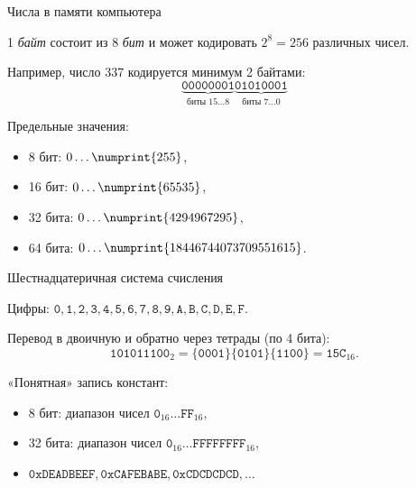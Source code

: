 \documentclass{beamer}
\newcommand{\num}[1]{\numprint{#1}}
\newcommand{\pcnum}[1]{\ensuremath{\mathtt{#1}}}
\newcommand{\bin}[1]{\pcnum{#1}_2}
\newcommand{\hex}[1]{\pcnum{#1}_{16}}
\begin{document}
\begin{frame}{Числа в памяти компьютера}

  1 \emph{байт} состоит из 8 \emph{бит} и может кодировать $2^8 = 256$
  различных чисел.

  Например, число 337 кодируется минимум 2 байтами:
  \[
    \underbrace{\pcnum{00000001}}_{\text{биты } 15 \ldots 8}
    \underbrace{\pcnum{01010001}}_{\text{биты } 7 \ldots 0}
  \]

  Предельные значения:
  \begin{itemize}
    \item 8 бит: $0 \ldots \num{255}$,
    \item 16 бит: $0 \ldots \num{65535}$,
    \item 32 бита: $0 \ldots \num{4294967295}$,
    \item 64 бита: $0 \ldots \num{18446744073709551615}$.
  \end{itemize}
\end{frame}

\begin{frame}{Шестнадцатеричная система счисления}

  Цифры: $\pcnum{0}, \pcnum{1}, \pcnum{2}, \pcnum{3}, \pcnum{4}, \pcnum{5},
  \pcnum{6}, \pcnum{7}, \pcnum{8}, \pcnum{9}, \pcnum{A}, \pcnum{B}, \pcnum{C},
  \pcnum{D}, \pcnum{E}, \pcnum{F}$.

  Перевод в двоичную и обратно через тетрады (по 4 бита):
  \[
    \bin{101011100} = \pcnum{\{0001\}\{0101\}\{1100\}} = \hex{15C}.
  \]

  «Понятная» запись констант:
  \begin{itemize}
    \item 8 бит: диапазон чисел $\hex{0} \ldots \hex{FF}$,
    \item 32 бита: диапазон чисел $\hex{0} \ldots \hex{FFFFFFFF}$,
    \item $\texttt{0xDEADBEEF}, \texttt{0xCAFEBABE}, \texttt{0xCDCDCDCD},
      \ldots$
  \end{itemize}

\end{frame}
\end{document}
